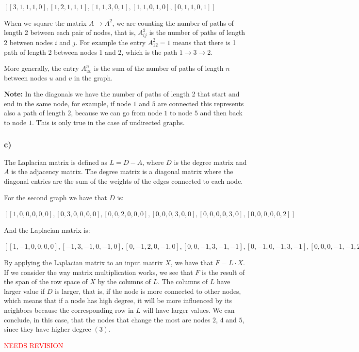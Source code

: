 \documentclass{article}
\begin{document}
$[
[3, 1, 1, 1, 0],
[1, 2, 1, 1, 1],
[1, 1, 3, 0, 1],
[1, 1, 0, 1, 0],
[0, 1, 1, 0, 1]]$

When we square the matrix $A \rightarrow A^2$, we are counting the number of paths of length 2 between each pair of nodes,
that is, $A_{ij}^2$ is the number of paths of length 2 between nodes $i$ and $j$.
For example the entry $A_{12}^2 = 1$ means that there is 1 path of length 2 between nodes 1 and 2, which is the path
$1 \rightarrow 3 \rightarrow 2$.

More generally, the entry $A_{uv}^n$ is the sum of the number of paths of length $n$ between nodes $u$ and $v$ in the graph.

\textbf{Note:} In the diagonals we have the number of paths of length 2 that start and end in the same node, for example,
if node $1$ and $5$ are connected this represents also a path of length 2, because we can go from node $1$ to node $5$ and
then back to node $1$. This is only true in the case of undirected graphs.

\subsubsection*{c)}

The Laplacian matrix is defined as $L = D - A$, where $D$ is the degree matrix and $A$ is the adjacency matrix.
The degree matrix is a diagonal matrix where the diagonal entries are the sum of the weights of the edges connected to each node.

For the second graph we have that $D$ is:

$[
[1, 0, 0, 0, 0, 0],
[0, 3, 0, 0, 0, 0],
[0, 0, 2, 0, 0, 0],
[0, 0, 0, 3, 0, 0],
[0, 0, 0, 0, 3, 0],
[0, 0, 0, 0, 0, 2]]$

And the Laplacian matrix is:

$[
[1, -1,  0, 0, 0, 0],
[-1, 3, -1, 0, -1, 0],
[0, -1,  2, 0, -1, 0],
[0, 0,  -1, 3, -1, -1],
[0, -1,  0, -1, 3, -1],
[0, 0,   0, -1, -1, 2]]$

By applying the Laplacian matrix to an input matrix $X$, we have that $F = L \cdot X$. 
If we consider the way matrix multiplication works, we see that $F$ is the result of the span of the row space of $X$ by the columns of $L$.
The columns of $L$ have larger value if $D$ is larger, that is, if the node is more connected to other nodes, which means that
if a node has high degree, it will be more influenced by its neighbors because the corresponding row in $L$ will have larger values.
We can conclude, in this case, that the nodes that change the most are nodes $2$, $4$ and $5$, since they have higher degree $(3)$.

\textcolor{red}{NEEDS REVISION}





























\newpage

 
\end{document}
